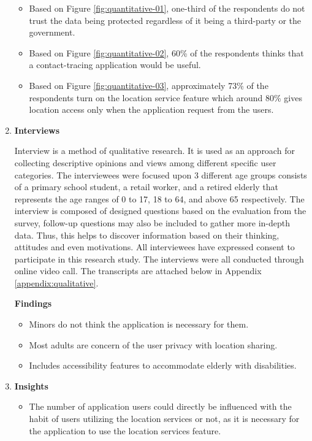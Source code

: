 \begin{enumerate}[1.]
        \begin{itemize}
          \item Based on Figure \ref{fig:quantitative-01}, one-third of the respondents do not trust the data being protected regardless of it being a third-party or the government.
          \item Based on Figure \ref{fig:quantitative-02}, 60\% of the respondents thinks that a contact-tracing application would be useful.
          \item Based on Figure \ref{fig:quantitative-03}, approximately 73\% of the respondents turn on the location service feature which around 80\% gives location access only when the application request from the users.
        \end{itemize}
    \item \textbf{Interviews}
      \par Interview is a method of qualitative research. It is used as an approach for collecting descriptive opinions and views among different specific user categories. The interviewees were focused upon 3 different age groups consists of a primary school student, a retail worker, and a retired elderly that represents the age ranges of 0 to 17, 18 to 64, and above 65 respectively. The interview is composed of designed questions based on the evaluation from the survey, follow-up questions may also be included to gather more in-depth data. Thus, this helps to discover information based on their thinking, attitudes and even motivations. All interviewees have expressed consent to participate in this research study. The interviews were all conducted through online video call. The transcripts are attached below in Appendix \ref{appendix:qualitative}.
      \par \textbf{Findings}
        \begin{itemize}
          \item Minors do not think the application is necessary for them.
          \item Most adults are concern of the user privacy with location sharing.
          \item Includes accessibility features to accommodate elderly with disabilities.
        \end{itemize}
    \item \textbf{Insights}
      \begin{itemize}
        \item The number of application users could directly be influenced with the habit of users utilizing the location services or not, as it is necessary for the application to use the location services feature.

\end{itemize}
\end{enumerate}

